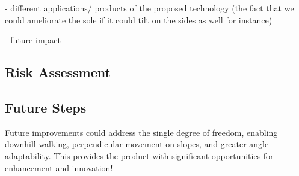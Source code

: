 \documentclass[lettersize,journal]{IEEEtran}
\begin{document}
- different applications/ products of the proposed technology (the fact that we could ameliorate the sole if it could tilt on the sides as well for instance)

- future impact

\subsection{Risk Assessment}

\subsection{Future Steps} 

Future improvements could address the single degree of freedom, enabling downhill walking, perpendicular movement on slopes, and greater angle adaptability. This provides the product with significant opportunities for enhancement and innovation!






\end{document}
